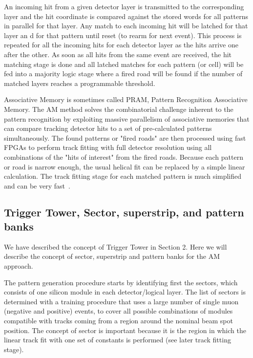 \noindent An incoming hit from a given detector layer is transmitted to the corresponding layer and the hit coordinate is compared against the stored words for all patterns in parallel for that layer. Any match to each incoming hit will be latched for that layer an
d for that pattern until reset (to rearm for next event). This process is repeated for all the incoming hits for each detector layer as the hits arrive one after the other. As soon as all hits from the same event are received, the hit matching stage is done and all latched matches for each pattern (or cell) will be fed into a majority logic stage where a fired road will be found if the number of matched layers reaches a programmable threshold. 
 

\noindent Associative Memory is sometimes called PRAM, Pattern Recognition Associative Memory. The AM method solves the combinatorial challenge inherent to the pattern recognition by exploiting massive parallelism of associative memories that can compare tracking detector hits to a set of pre-calculated patterns simultaneously. The found patterns or "fired roads" are then processed using fast FPGAs to perform track fitting with full detector resolution using all combinations of the "hits of interest" from the fired roads. Because each pattern or road is narrow enough, the usual helical fit can be replaced by a simple linear calculation. The track fitting stage for each matched pattern is much simplified and can be very fast~\cite{bib:Ann-09}.

\subsection{Trigger Tower, Sector, superstrip, and pattern banks}

\noindent We have described the concept of Trigger Tower in Section 2. Here we will describe the concept of sector, superstrip and pattern banks for the AM approach.

\noindent The pattern generation procedure starts by identifying first the sectors, which consists of one silicon module in each detector/logical layer. The list of sectors is determined with a training procedure that uses a large number of single muon (negative and positive) events, to cover all possible combinations of modules compatible with tracks coming from a region around the nominal beam spot position. The concept of sector is important because it is the region in which the linear track fit with one set of constants is performed (see later track fitting stage).

